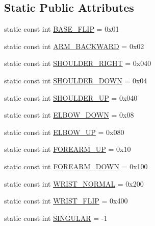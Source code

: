 \subsection*{Static Public Attributes}
\begin{DoxyCompactItemize}
\item 
static const int \hyperlink{classIArmConfiguration_a350358b5db8e596cfe0a807e86606f73}{B\-A\-S\-E\-\_\-\-F\-L\-I\-P} = 0x01
\item 
static const int \hyperlink{classIArmConfiguration_a54057fc8c00daa9cf44af3cf3e89ba47}{A\-R\-M\-\_\-\-B\-A\-C\-K\-W\-A\-R\-D} = 0x02
\item 
static const int \hyperlink{classIArmConfiguration_a669c41de4b34b0c56acaabd46a43dadb}{S\-H\-O\-U\-L\-D\-E\-R\-\_\-\-R\-I\-G\-H\-T} = 0x040
\item 
static const int \hyperlink{classIArmConfiguration_ad715705eeb8c3835f2e0b749e4e8e043}{S\-H\-O\-U\-L\-D\-E\-R\-\_\-\-D\-O\-W\-N} = 0x04
\item 
static const int \hyperlink{classIArmConfiguration_ad933d24036398d6887f6b208866948eb}{S\-H\-O\-U\-L\-D\-E\-R\-\_\-\-U\-P} = 0x040
\item 
static const int \hyperlink{classIArmConfiguration_ae27619e20b7e7480cdbfc20062bb251b}{E\-L\-B\-O\-W\-\_\-\-D\-O\-W\-N} = 0x08
\item 
static const int \hyperlink{classIArmConfiguration_a408617f0f4302aad13dc8cb43e377d50}{E\-L\-B\-O\-W\-\_\-\-U\-P} = 0x080
\item 
static const int \hyperlink{classIArmConfiguration_a4c640de35c1fc5c61b5dc950588089d7}{F\-O\-R\-E\-A\-R\-M\-\_\-\-U\-P} = 0x10
\item 
static const int \hyperlink{classIArmConfiguration_a4243f9146bc20c3ce2c8796c04852cb4}{F\-O\-R\-E\-A\-R\-M\-\_\-\-D\-O\-W\-N} = 0x100
\item 
static const int \hyperlink{classIArmConfiguration_ae2cf37e0ff2e11888bcf97a5bf9ca824}{W\-R\-I\-S\-T\-\_\-\-N\-O\-R\-M\-A\-L} = 0x200
\item 
static const int \hyperlink{classIArmConfiguration_a80649ead98210dbc5fe8d9c28f1f4f98}{W\-R\-I\-S\-T\-\_\-\-F\-L\-I\-P} = 0x400
\item 
static const int \hyperlink{classIArmConfiguration_a02c7db5fe651e5e14928c214dfe53da6}{S\-I\-N\-G\-U\-L\-A\-R} = -\/1
\end{DoxyCompactItemize}
